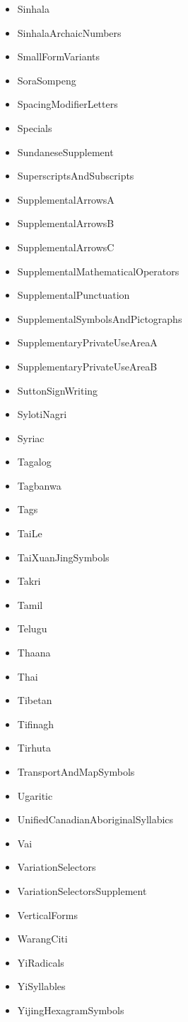 ﻿\documentclass{article}
\newenvironment{itemlist}{%
  \begin{itemize}
	\setlength{\itemsep}{0pt}
	\setlength{\parsep}{0pt}
	\setlength{\topsep}{0pt}
	\setlength{\partopsep}{0pt}
	\setlength{\parskip}{0pt}
	\setlength{\labelsep}{5pt}}%
{
  \end{itemize}}
\begin{document}
\begin{multicols}{2}
\begin{itemlist}
				\item Sinhala
				\item SinhalaArchaicNumbers
				\item SmallFormVariants
				\item SoraSompeng
				\item SpacingModifierLetters
				\item Specials
				\item SundaneseSupplement
				\item SuperscriptsAndSubscripts
				\item SupplementalArrowsA
				\item SupplementalArrowsB
				\item SupplementalArrowsC
				\item SupplementalMathematicalOperators
				\item SupplementalPunctuation
				\item SupplementalSymbolsAndPictographs
				\item SupplementaryPrivateUseAreaA
				\item SupplementaryPrivateUseAreaB
				\item SuttonSignWriting
				\item SylotiNagri
				\item Syriac
				\item Tagalog
				\item Tagbanwa
				\item Tags
				\item TaiLe
				\item TaiXuanJingSymbols
				\item Takri
				\item Tamil
				\item Telugu
				\item Thaana
				\item Thai
				\item Tibetan
				\item Tifinagh
				\item Tirhuta
				\item TransportAndMapSymbols
				\item Ugaritic
				\item UnifiedCanadianAboriginalSyllabics
				\item Vai
				\item VariationSelectors
				\item VariationSelectorsSupplement
				\item VerticalForms
				\item WarangCiti
				\item YiRadicals
				\item YiSyllables
				\item YijingHexagramSymbols
			\end{itemlist}
		\end{multicols}
\end{document}

